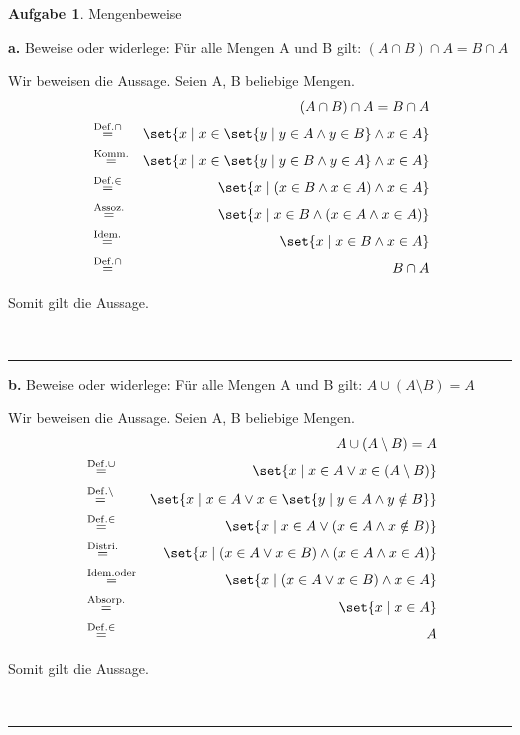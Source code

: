 \documentclass[10pt,leqno ]{article}
\DeclarePairedDelimiter\set\{\}
\newcommand\customeq[1]{\overset{\mathrm{#1}}{=}}
\theoremstyle{definition}
\newtheorem{problem}[theorem]{Aufgabe}
\newenvironment{solution}[1][L]{\begin{doublespace}\textbf{#1.}\quad }{\ \rule{0.5em}{0.5em}\end{doublespace}}
\begin{document}
\begin{problem}
Mengenbeweise
\end{problem}

\begin{solution}[a]
Beweise oder widerlege: Für alle Mengen A und B gilt: \( (A \cap B) \cap A = B \cap A \)

Wir beweisen die Aussage. Seien A, B beliebige Mengen.
\begin{align*}
    & & (A \cap B) \cap A = B \cap A \\
    & \customeq{Def. \cap} & \set{x \mid x \in \set{y \mid y \in A \land y \in B} \land x \in A} \\
    & \customeq{Komm.} & \set{x \mid x \in \set{y \mid y \in B \land y \in A} \land x \in A} \\
    & \customeq{Def. \in} & \set{x \mid (x \in B \land x \in A) \land x \in A} \\
    & \customeq{Assoz.} & \set{x \mid x \in B \land (x \in A \land x \in A)} \\
    & \customeq{Idem.} & \set{x \mid x \in B \land x \in A} \\
    & \customeq{Def. \cap} & B \cap A \\
\end{align*}

Somit gilt die Aussage.

\end{solution}

\begin{solution}[b]
Beweise oder widerlege: Für alle Mengen A und B gilt: \( A \cup (A \setminus B ) = A  \)

Wir beweisen die Aussage. Seien A, B beliebige Mengen.
\begin{align*}
    & & A \cup (A \setminus B ) = A \\
    & \customeq{Def. \cup} & \set{x \mid x \in A \lor x \in (A \setminus B)} \\
    & \customeq{Def. \setminus} & \set{x \mid x \in A \lor x \in \set{y \mid y \in A \land y \notin B}} \\
    & \customeq{Def. \in} & \set{x \mid x \in A \lor (x \in A \land x \notin B)} \\
    & \customeq{Distri.} & \set{x \mid (x \in A \lor x \in B) \land (x \in A \land x \in A)} \\
    & \customeq{Idem. oder} & \set{x \mid (x \in A \lor x \in B) \land x \in A} \\
    & \customeq{Absorp.} & \set{x \mid x \in A} \\
    & \customeq{Def. \in} & A \\
\end{align*}

Somit gilt die Aussage.

\end{solution}
\end{document}
